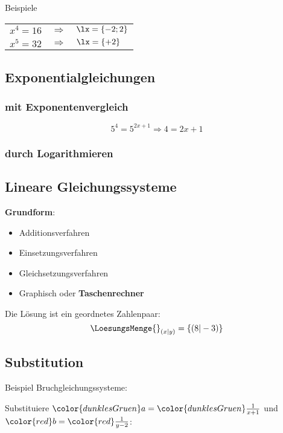 \begin{multicols}{2}
Beispiele

\begin{tabular}{rcl}
$x^4=16$ & $\Longrightarrow$ & $\lx=\{-2; 2\}  $ \\
$x^5=32$ & $\Longrightarrow$ & $\lx=\{+2\}  $ \\

\end{tabular}

\subsection*{Exponentialgleichungen}
\subsubsection*{mit Exponentenvergleich}

$$5^4 = 5^{2x+1} \Longrightarrow  4=2x+1$$

\subsubsection*{durch Logarithmieren}


\subsection*{Lineare Gleichungssysteme}
\textbf{Grundform}:

\begin{itemize}
\item Additionsverfahren
\item Einsetzungsverfahren
\item Gleichsetzungsverfahren
\item Graphisch oder \textbf{Taschenrechner}
\end{itemize}
Die Lösung ist ein geordnetes Zahlenpaar:
$$\LoesungsMenge{}_{(x | y)} = \{(8 | -3)\}$$



\headerUndFooterJedeSeite{}

\subsection*{Substitution}
Beispiel Bruchgleichungssysteme:

Substituiere
${\color{dunklesGruen}a}={\color{dunklesGruen}\frac1{x+1}}$ und
${\color{red}b} = {\color{red}\frac1{y-2}}$:


\end{multicols}
